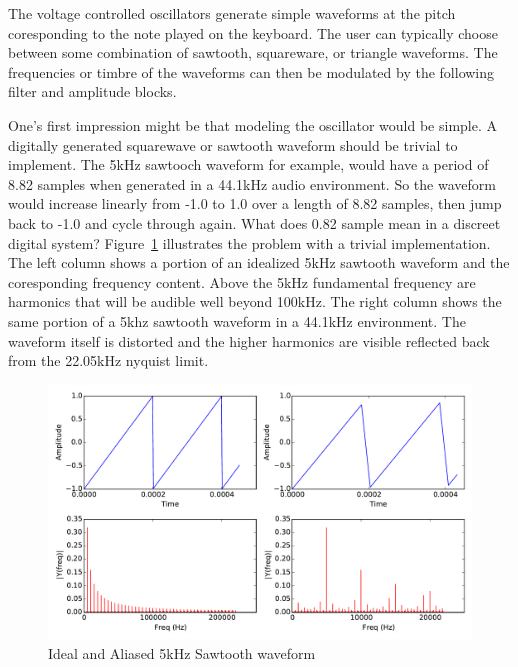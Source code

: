 The voltage controlled oscillators generate simple waveforms at the pitch coresponding to the note played on the keyboard. The user can typically choose between some combination of sawtooth, squareware, or triangle waveforms. The frequencies or timbre of the waveforms can then be modulated by the following filter and amplitude blocks.

One's first impression might be that modeling the oscillator would be simple. A digitally generated squarewave or sawtooth waveform should be trivial to implement. The 5kHz sawtooch waveform for example, would have a period of 8.82 samples when generated in a 44.1kHz audio environment. So the waveform would increase linearly from -1.0 to 1.0 over a length of 8.82 samples, then jump back to -1.0 and cycle through again. What does 0.82 sample mean in a discreet digital system? Figure~\ref{fig:aliasing_sawtooth} illustrates the problem with a trivial implementation. The left column shows a portion of an idealized 5kHz sawtooth waveform and the coresponding frequency content. Above the 5kHz fundamental frequency are harmonics that will be audible well beyond 100kHz. The right column shows the same portion of a 5khz sawtooth waveform in a 44.1kHz environment. The waveform itself is distorted and the higher harmonics are visible reflected back from the 22.05kHz nyquist limit.

\begin{figure}[h]
    \centering
    \includegraphics[width=\textwidth]{plots/graphics/sawtooth.pdf}
    \caption{Ideal and Aliased 5kHz Sawtooth waveform}
    \label{fig:aliasing_sawtooth}
\end{figure}
